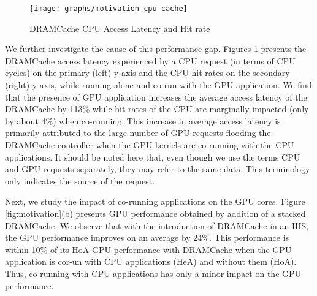 \begin{figure}[htb]
	\centering
	\texttt{[image: graphs/motivation-cpu-cache]}
	\caption{DRAMCache CPU Access Latency and Hit rate}
	\label{fig:motivation-cpu-cache}
\end{figure}

\par We further investigate the cause of this performance gap. Figures \ref{fig:motivation-cpu-cache} presents the DRAMCache access latency experienced by a CPU request (in terms of CPU cycles) on the primary (left) y-axis and the CPU hit rates on the secondary (right) y-axis, while running alone and co-run with the GPU application. We find that the presence of GPU application increases the average access latency of the DRAMCache by 113\% while hit rates of the CPU are marginally impacted (only by about 4\%) when co-running.
This increase in average access latency is primarily attributed to the large
number of GPU requests flooding the DRAMCache controller when the GPU kernels are co-running with the CPU applications.
It should be noted here that, even though we use the terms CPU and GPU requests separately, they may refer to the same data. This terminology only indicates the source of the request. 
\par Next, we study the impact of co-running applications on the GPU cores. Figure \ref{fig:motivation}(b) presents GPU performance obtained by addition of a stacked DRAMCache.
We observe that with the introduction of DRAMCache in an IHS, the GPU performance improves on an average by 24\%. This performance is within 10\% of its HoA GPU performance with DRAMCache when the GPU application is cor-un with CPU applications (HeA) and without them (HoA).
Thus, co-running with CPU applications has only a minor impact on the GPU performance. 
